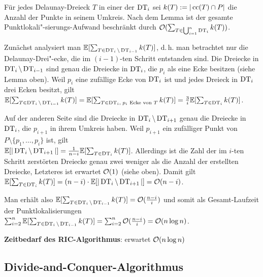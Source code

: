 \begin{Beweis}
    Für jedes Delaunay-Dreieck $T$ in einer der $\operatorname{DT}_i$ sei
    $k(T) := |\operatorname{cc}(T) \cap P|$ die Anzahl der Punkte in seinem Umkreis.
    Nach dem Lemma ist der gesamte  Punktlokali"-sierungs-Aufwand beschränkt durch
    $\mathcal{O}(\sum_{T \in \bigcup_{i=1}^n \operatorname{DT}_i} k(T))$.

    Zunächst analysiert man $\mathbb{E}[\sum_{T \in \operatorname{DT}_i \setminus \operatorname{DT}_{i-1}} k(T)]$,
    d.\,h. man betrachtet nur die Delaunay-Drei"-ecke, die im $(i-1)$-ten Schritt entstanden sind.
    Die Dreiecke in $\operatorname{DT}_i \setminus \operatorname{DT}_{i-1}$ sind genau die Dreiecke
    in $\operatorname{DT}_i$, die $p_i$ als eine Ecke besitzen (siehe Lemma oben).
    Weil $p_i$ eine
    zufällige Ecke von $\operatorname{DT}_i$ ist und jedes Dreieck in $\operatorname{DT}_i$ drei Ecken besitzt, gilt\\
    $\mathbb{E}[\sum_{T \in \operatorname{DT}_i \setminus \operatorname{DT}_{i-1}} k(T)]
    = \mathbb{E}[\sum_{T \in \operatorname{DT}_i,\; \text{$p_i$ Ecke von $T$}} k(T)]
    = \frac{3}{i} \mathbb{E}[\sum_{T \in \operatorname{DT}_i} k(T)]$.

    Auf der anderen Seite sind die Dreiecke in $\operatorname{DT}_i \setminus \operatorname{DT}_{i+1}$ genau die Dreiecke
    in $\operatorname{DT}_i$, die $p_{i+1}$ in ihrem Umkreis haben.
    Weil $p_{i+1}$ ein zufälliger Punkt von $P \setminus \{p_1, \dotsc, p_i\}$ ist, gilt\\
    $\mathbb{E}[|\operatorname{DT}_i \setminus \operatorname{DT}_{i+1}|] = \frac{1}{n-i} \mathbb{E}[\sum_{T \in \operatorname{DT}_i} k(T)]$.
    Allerdings ist die Zahl der im $i$-ten Schritt zerstörten Dreiecke genau zwei weniger als
    die Anzahl der erstellten Dreiecke, Letzteres ist erwartet $\mathcal{O}(1)$ (siehe oben).
    Damit gilt
    $\mathbb{E}[\sum_{T \in \operatorname{DT}_i} k(T)] = (n-i) \cdot \mathbb{E}[|\operatorname{DT}_i \setminus \operatorname{DT}_{i+1}|] = \mathcal{O}(n - i)$.

    Man erhält also $\mathbb{E}[\sum_{T \in \operatorname{DT}_i \setminus \operatorname{DT}_{i-1}} k(T)] = \mathcal{O}(\frac{n - i}{i})$ und
    somit als Gesamt-Laufzeit der Punktlokalisierungen
    $\sum_{i=2}^n \mathbb{E}[\sum_{T \in \operatorname{DT}_i \setminus \operatorname{DT}_{i-1}} k(T)] =
    \sum_{i=2}^n \mathcal{O}(\frac{n-i}{i}) = \mathcal{O}(n \log n)$.
\end{Beweis}

\linie

\textbf{Zeitbedarf des RIC-Algorithmus}:
erwartet $\mathcal{O}(n \log n)$

\pagebreak

\subsection{%
    Divide-and-Conquer-Algorithmus%
}

